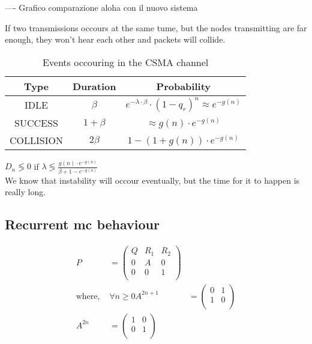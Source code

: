 ---- Grafico comparazione aloha con il nuovo sistema

If two transmissions occours at the same tume, but the nodes transmitting are far
 enough, they won't hear each other and packets will collide.
 \begin{table}[h!]
\centering
\begin{tabular}{|c|c|c|}
\textbf{Type} & \textbf{Duration} & \textbf{Probability}                                         \\ \hline
IDLE          & $\beta$           & $e^{-\lambda \cdot \beta} \cdot (1-q_r)^n \approx e^{-g(n)}$ \\
SUCCESS       & $1+\beta$         & $\approx g(n) \cdot e^{-g(n)}$                               \\
COLLISION     & $2 \beta$         & $1-(1+g(n))\cdot e^{-g(n)}$
\end{tabular}
\caption{Events occouring in the CSMA channel}
\label{TAB:tx_prob}
\end{table}
$D_n \lessgtr 0 $ if $\lambda \lessgtr \frac{g(n) \cdot e^{-g(n)}}{\beta + 1 - e^{-g(n)}}$\\
We know that instability will occour eventually, but the time for it to happen is really long.

\subsection{Recurrent \gls{mc} behaviour}
\begin{figure}
  
  \caption{}
  \label{}
\end{figure}

\begin{equation}\begin{split}
  P&=\begin{pmatrix}
      Q & R_1 & R_2 \\
      0 & A   & 0 \\
      0 & 0   & 1 \\
  \end{pmatrix}\\
  \text{where, }&\forall n\ge 0
  A^{2n+1}&=\begin{pmatrix}
      0 & 1 \\
      1 & 0 \\
  \end{pmatrix}\\
  A^{2n}&=\begin{pmatrix}
      1 & 0 \\
      0 & 1 \\
  \end{pmatrix}\\
\end{split}\end{equation}

